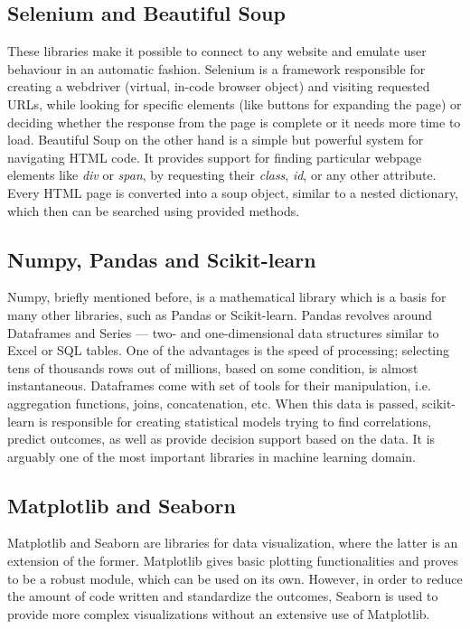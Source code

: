 \subsection{Selenium and Beautiful Soup}
These libraries make it possible to connect to any website and emulate user behaviour in an automatic fashion. Selenium is a framework responsible for creating a webdriver (virtual, in-code browser object) and visiting requested URLs, while looking for specific elements (like buttons for expanding the page) or deciding whether the response from the page is complete or it needs more time to load. Beautiful Soup on the other hand is a simple but powerful system for navigating HTML code. It provides support for finding particular webpage elements like \textit{div} or \textit{span}, by requesting their \textit{class}, \textit{id}, or any other attribute. Every HTML page is converted into a soup object, similar to a nested dictionary, which then can be searched using provided methods.

\subsection{Numpy, Pandas and Scikit-learn}
Numpy, briefly mentioned before, is a mathematical library which is a basis for many other libraries, such as Pandas or Scikit-learn. Pandas revolves around Dataframes and Series --- two- and one-dimensional data structures similar to Excel or SQL tables. One of the advantages is the speed of processing; selecting tens of thousands rows out of millions, based on some condition, is almost instantaneous. Dataframes come with set of tools for their manipulation, i.e. aggregation functions, joins, concatenation, etc. When this data is passed, scikit-learn is responsible for creating statistical models trying to find correlations, predict outcomes, as well as provide decision support based on the data. It is arguably one of the most important libraries in machine learning domain.

\subsection{Matplotlib and Seaborn}
Matplotlib and Seaborn are libraries for data visualization, where the latter is an extension of the former. Matplotlib gives basic plotting functionalities and proves to be a robust module, which can be used on its own. However, in order to reduce the amount of code written and standardize the outcomes, Seaborn is used to provide more complex visualizations without an extensive use of Matplotlib.


